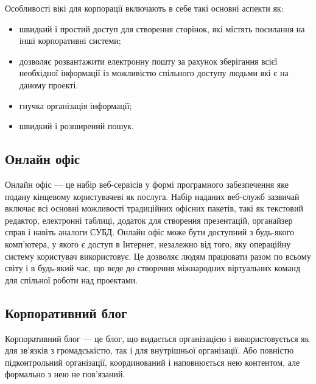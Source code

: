 \par Особливості вікі для корпорації включають в себе такі основні аспекти як:
\begin{itemize}
\item швидкий і простий доступ для створення сторінок, які містять посилання на інші корпоративні системи;
\item дозволяє розвантажити електронну пошту за рахунок зберігання всієї необхідної інформації із можливістю спільного доступу людьми які є на даному проекті.
\item гнучка організація інформації;
\item швидкий і розширений пошук.
\end{itemize}



\subsection{Онлайн офіс}
Онлайн офіс --- це набір веб-сервісів у формі програмного забезпечення яке подану кінцевому користувачеві як послуга. 
Набір наданих веб-служб зазвичай включає всі основні можливості традиційних офісних пакетів, такі як текстовий редактор, електронні таблиці, додаток для створення презентацій, органайзер справ і навіть аналоги СУБД. 
Онлайн офіс може бути доступний з будь-якого комп'ютера, у якого є доступ в Інтернет, незалежно від того, яку операційну систему користувач використовує. 
Це дозволяє людям працювати разом по всьому світу і в будь-який час, що веде до створення міжнародних віртуальних команд для спільної роботи над проектами. 


\subsection{Корпоративний блог}
Корпоративний блог --- це блог, що видається організацією і використовується як для зв'язків з громадськістю, так і для внутрішньої організації. 
Або повністю підконтрольний організації, координований і наповнюється нею контентом, але формально з нею не пов'язаний.



